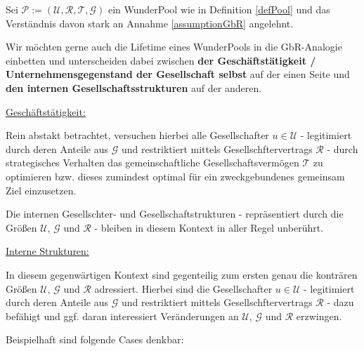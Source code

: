 \begin{Fazit}
\label{lifetimeGbR} 

Sei $\mathcal{P} := \left( \mathcal{U}, \mathcal{R}, \mathcal{T}, \mathcal{G} \right)$ ein WunderPool wie in Definition \ref{defPool} und das Verständnis davon stark an Annahme \ref{assumptionGbR} angelehnt.

\vspace{0.2cm}

Wir möchten gerne auch die Lifetime eines WunderPools in die GbR-Analogie einbetten und unterscheiden dabei zwischen \textbf{der Geschäftstätigkeit / Unternehmens\-gegenstand der Gesellschaft selbst} auf der einen Seite und \textbf{den internen Gesellschaftsstrukturen} auf der anderen.

\noindent\hrulefill

\underline{Geschäftstätigkeit:}

\vspace{0.2cm}

Rein abstakt betrachtet, versuchen hierbei alle Gesellschafter $u \in \mathcal{U}$ - legiti\-miert durch deren Anteile aus $\mathcal{G}$ und restriktiert mittels Gesellschftervertrags $\mathcal{R}$ - durch strategisches Verhalten das gemeinschaftliche Gesellschaftsvermögen $\mathcal{T}$ zu optimieren bzw. dieses zumindest optimal für ein zweckgebundenes gemeinsam Ziel einzusetzen.

\vspace{0.2cm}

Die internen Gesellschter- und Gesellschaftstrukturen - repräsentiert durch die Größen $\mathcal{U}$, $\mathcal{G}$ und $\mathcal{R}$ - bleiben in diesem Kontext in aller Regel unberührt.

\noindent\hrulefill

\underline{Interne Strukturen:}

\vspace{0.2cm}

In diesem gegenwärtigen Kontext sind gegenteilig zum ersten genau die konträren Größen $\mathcal{U}$, $\mathcal{G}$ und $\mathcal{R}$ adressiert. Hierbei sind die Gesellschafter $u \in \mathcal{U}$ - legitimiert durch deren Anteile aus $\mathcal{G}$ und restriktiert mittels Gesellschftervertrags $\mathcal{R}$ - dazu befähigt und ggf. daran interessiert Veränderungen an $\mathcal{U}$, $\mathcal{G}$ und $\mathcal{R}$ erzwingen.

Beispielhaft sind folgende Cases denkbar:


\end{Fazit}
